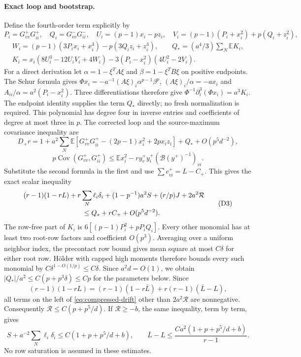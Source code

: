 \documentclass[10pt]{article}
\numberwithin{equation}{section}
\newcommand{\1}{\mathbf1}
\begin{document}
\paragraph{Exact loop and bootstrap.}
Define the fourth-order term explicitly by
\[
 P_i=G^+_{vv}G^+_{ii},\quad Q_i=G^-_{vv}G^-_{ii},\quad
 U_i=(p-1)x_i-pz_i,\quad
 V_i=(p-1)(P_i+x_i^2)+p(Q_i+z_i^2),
\]
\[
 \begin{gathered}
 W_i=(p-1)(3P_ix_i+x_i^3)-p(3Q_iz_i+z_i^3),\qquad
 Q_*=(a^4/3)\sum_N\mathbb E K_i,\\
 K_i=x_i(8U_i^3-12U_iV_i+4W_i)
          -3(P_i-x_i^2)(4U_i^2-2V_i).
 \end{gathered}
\]
For a direct derivation let $\alpha=1-\xi^TA\xi$ and
$\beta=1-\xi^TB\xi$ on positive endpoints. The Schur formula gives
$\Phi x_i=-a^{-1}(A\xi)_i\alpha^{p-1}\beta^p$,
$(A\xi)_i/\alpha=-ax_i$ and
$A_{ii}/\alpha=a^2(P_i-x_i^2)$.
Three differentiations therefore give
$\Phi^{-1}\partial_i^3(\Phi x_i)=a^3K_i$.
The endpoint identity supplies the term $Q_*$ directly; no fresh
normalization is required. This polynomial has degree four in
inverse entries and coefficients of degree at most three in $p$.
The corrected loop and the source-maximum covariance inequality are
\[
 D_+r=1+a^2\sum_N\mathbb E
 [G^+_{vv}G^+_{ii}-(2p-1)x_i^2+2px_iz_i]
       +Q_*+O(p^5d^{-2}),
\]
\[
 p\operatorname{Cov}(G^+_{vv},G^+_{ii})
 \le\mathbb E x_i^2-r y_v^+y_i^+(\mathcal B(y^+)^{-1})_{vi}.
\]
Substitute the second formula in the first and use
$\sum c_{vi}^+=L-C_+$. This gives the exact scalar inequality
\[
 \begin{split}
 &(r-1)(1-rL)+r\sum_N\ell_i\delta_i
 +(1-p^{-1})a^2S+(r/p)J+2a^2\mathcal R\\
 &\hspace{30mm}\le Q_*+rC_++O(p^5d^{-2}).
 \end{split}\tag{D3}\label{eq:compressed-drift}
\]
The row-free part of $K_i$ is
$6[(p-1)P_i^2+pP_iQ_i]$. Every other monomial has at least two
root-row factors and coefficient $O(p^3)$. Averaging over a uniform
neighbor index, the precontact row bound gives mean square at most
$C\delta$ for either root row. H\"older with capped high moments
therefore bounds every such monomial by
$C\delta^{1-O(1/p)}\le C\delta$.
Since $a^2d=O(1)$, we obtain
$|Q_*|/a^2\le C(p+p^3\delta)\le Cp$ for the parameters below.
Since
\[
 (r-1)(1-rL)=(r-1)(1-r\bar L)+r(r-1)(\bar L-L),
\]
all terms on the left of \eqref{eq:compressed-drift} other than
$2a^2\mathcal R$ are nonnegative. Consequently
$\mathcal R\le C(p+p^5/d)$. If $\mathcal R\ge-b$, the same
inequality, term by term, gives
\[
 S+a^{-2}\sum_N\ell_i\delta_i\le C(1+p+p^5/d+b),\qquad
 \bar L-L\le\frac{Ca^2(1+p+p^5/d+b)}{r-1}.
 \tag{D4}\label{eq:compressed-bootstrap}
\]
No row saturation is assumed in these estimates.
\end{document}
